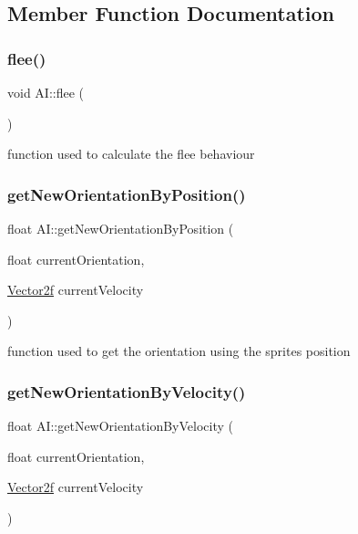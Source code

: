 \subsection{Member Function Documentation}
\mbox{\label{class_a_i_a89507f04066c22ee528a14cc4d0edc7e}} 
\subsubsection{\texorpdfstring{flee()}{flee()}}
{\footnotesize\ttfamily void A\+I\+::flee (\begin{DoxyParamCaption}{ }\end{DoxyParamCaption})}

function used to calculate the flee behaviour \mbox{\label{class_a_i_ad61ab7dbffc1376a0d61c4b1ede418a8}} 
\subsubsection{\texorpdfstring{getNewOrientationByPosition()}{getNewOrientationByPosition()}}
{\footnotesize\ttfamily float A\+I\+::get\+New\+Orientation\+By\+Position (\begin{DoxyParamCaption}\item[{float}]{current\+Orientation,  }\item[{\mbox{\hyperlink{class_vector2f}{Vector2f}}}]{current\+Velocity }\end{DoxyParamCaption})}

function used to get the orientation using the sprites position \mbox{\label{class_a_i_af8eeea1934b1e37dff601aedb329004d}} 
\subsubsection{\texorpdfstring{getNewOrientationByVelocity()}{getNewOrientationByVelocity()}}
{\footnotesize\ttfamily float A\+I\+::get\+New\+Orientation\+By\+Velocity (\begin{DoxyParamCaption}\item[{float}]{current\+Orientation,  }\item[{\mbox{\hyperlink{class_vector2f}{Vector2f}}}]{current\+Velocity }\end{DoxyParamCaption})}

